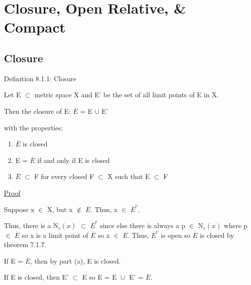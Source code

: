 \newpage
\section[Day 8: Open Relative and Compact]
{Closure, Open Relative, \& Compact}

\subsection{ Closure }

{ \color{blue} Definition 8.1.1: Closure } 

	\begin{adjustbox}{minipage=14cm, right, vspace=0.1cm 0cm}
        Let E $\subset$ metric space X and E' be the set of all
        limit points of E in X.

        \qquad Then the closure of E:
            \qquad $\overline{E}$ = E $\cup$ E'

        with the properties:
	\end{adjustbox}

	\begin{enumerate}[label=(\alph*), leftmargin=2cm, itemsep=0.1cm]
        \item $\overline{E}$ is closed
        
        \item E = $\overline{E}$ if and only if E is closed
        
        \item $\overline{E}$ $\subset$ F for every closed F $\subset$ X
        such that E $\subset$ F
    \end{enumerate}

{ \color{magenta} \underline{Proof} } 

	Suppose x $\in$ X, but x $\not \in$ $\overline{E}$. Thus, x $\in$ $\overline{E}^c$.

	Thus, there is a N$_r(x)$ $\subset$ $\overline{E}^c$ since else there is
	always a p $\in$ N$_r(x)$ where p $\in$ $\overline{E}$ so x is a limit point
	of $\overline{E}$ so x $\in$ $\overline{E}$.
	Thus, $\overline{E}^c$ is open so $\overline{E}$ is closed by
	{\color{red} theorem 7.1.7}.

	\vspace{0.2cm}

	If E = $\overline{E}$, then by part (a), E is closed.

	If E is closed, then E' $\subset$ E so E = E $\cup_{}^{}$ E' = $\overline{E}$.

	\vspace{0.2cm}

